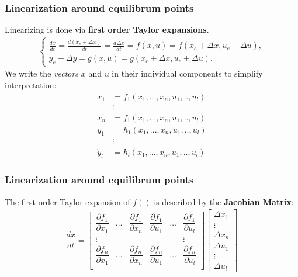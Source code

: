 \begin{frame}
	\frametitle{Linearization around equilibrum points}
	Linearizing is done via \textbf{first order Taylor expansions}.
	\begin{align*}
	\left\{ \begin{matrix}
	\frac{dx}{dt} = \frac{d (x_e + \Delta x)}{dt} = \frac{d \Delta x}{dt} = f(x,u) = f(x_e+\Delta x, u_e + \Delta u), \\
	y_e + \Delta y = g(x, u) = g(x_e + \Delta x, u_e + \Delta u).
	\end{matrix}\right.
	\end{align*}
	We write the \emph{vectors} $x$ and $u$ in their individual components to simplify interpretation:
	\begin{align*}
		\dot{x}_1 &= f_1(x_1, ..., x_n, u_1, .., u_l) \\
			&\vdots \\
		\dot{x}_n &= f_1(x_1, ..., x_n, u_1, .., u_l) \\
		\dot{y}_1 &= h_1(x_1, ..., x_n, u_1, .., u_l) \\
			&\vdots \\
		\dot{y}_l &= h_l(x_1, ..., x_n, u_1, .., u_l) 
	\end{align*}
\end{frame}

\begin{frame}
	\frametitle{Linearization around equilibrum points}
	The first order Taylor expansion of $f()$ is described by the \textbf{Jacobian Matrix}:
	\begin{align*}
		\dfrac{dx}{dt} = 
					\begin{bmatrix}
						\dfrac{\partial f_1}{\partial x_1} 	&\dots 	&\dfrac{\partial f_1}{\partial x_n} 	&\dfrac{\partial f_1}{\partial u_1} 	&\dots 	&\dfrac{\partial f_1}{\partial u_l} \\
						\vdots 						&		&							&					&		&\vdots  \\
						\dfrac{\partial f_n}{\partial x_1} 	&\dots 	&\dfrac{\partial f_n}{\partial x_n} 	&\dfrac{\partial f_n}{\partial u_1} 	&\dots 	&\dfrac{\partial f_n}{\partial u_l} \\
					\end{bmatrix}
					\begin{bmatrix}
						\Delta x_1 \\
						\vdots \\
						\Delta x_n \\
						\Delta u_1 \\
						\vdots \\
						\Delta u_l
					\end{bmatrix}
	\end{align*}
\end{frame}

